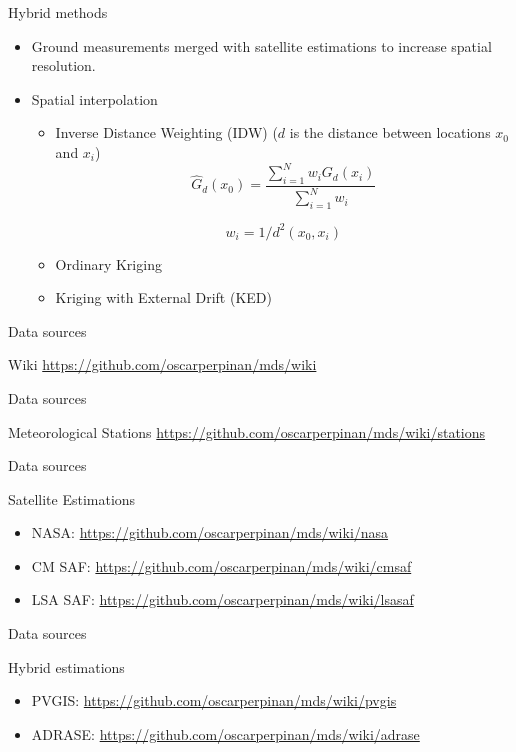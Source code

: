 \documentclass[xcolor={usenames,svgnames,dvipsnames}]{beamer}
\begin{document}
\begin{frame}[label={sec:orgdb620e9}]{Hybrid methods}
\begin{itemize}
\item Ground measurements merged with satellite estimations to increase spatial resolution.
\item Spatial interpolation
\begin{itemize}
\item \alert{Inverse Distance Weighting (IDW)} (\(d\) is the distance between locations \(x_0\) and \(x_i\))
\[
\widehat{G}_d(x_0) = \frac{\sum_{i=1}^N w_i G_{d}(x_i)}{\sum_{i=1}^N w_i} 
\]

\[
  w_i = 1/d^2(x_0, x_i)
\]
\item \alert{Ordinary Kriging}
\item \alert{Kriging with External Drift (KED)}
\end{itemize}
\end{itemize}
\end{frame}

\begin{frame}[label={sec:orgb226503}]{Data sources}
\begin{block}{Wiki}
\url{https://github.com/oscarperpinan/mds/wiki}
\end{block}
\end{frame}

\begin{frame}[label={sec:org5c1718d}]{Data sources}
\begin{block}{Meteorological Stations}
\url{https://github.com/oscarperpinan/mds/wiki/stations}
\end{block}
\end{frame}

\begin{frame}[label={sec:org93845ec}]{Data sources}
\begin{block}{Satellite Estimations}
\begin{itemize}
\item NASA: \url{https://github.com/oscarperpinan/mds/wiki/nasa}
\item CM SAF: \url{https://github.com/oscarperpinan/mds/wiki/cmsaf}
\item LSA SAF: \url{https://github.com/oscarperpinan/mds/wiki/lsasaf}
\end{itemize}
\end{block}
\end{frame}

\begin{frame}[label={sec:org5fe8ae1}]{Data sources}
\begin{block}{Hybrid estimations}
\begin{itemize}
\item PVGIS: \url{https://github.com/oscarperpinan/mds/wiki/pvgis}
\item ADRASE: \url{https://github.com/oscarperpinan/mds/wiki/adrase}
\end{itemize}
\end{block}
\end{frame}
\end{document}
